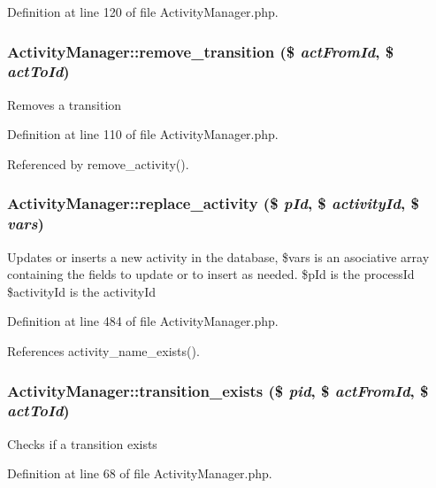 Definition at line 120 of file Activity\-Manager.php.
\subsubsection{\setlength{\rightskip}{0pt plus 5cm}Activity\-Manager::remove\_\-transition (\$ {\em act\-From\-Id}, \$ {\em act\-To\-Id})}\label{classActivityManager_a7}


Removes a transition 

Definition at line 110 of file Activity\-Manager.php.

Referenced by remove\_\-activity().
\subsubsection{\setlength{\rightskip}{0pt plus 5cm}Activity\-Manager::replace\_\-activity (\$ {\em p\-Id}, \$ {\em activity\-Id}, \$ {\em vars})}\label{classActivityManager_a19}


Updates or inserts a new activity in the database, \$vars is an asociative array containing the fields to update or to insert as needed. \$p\-Id is the process\-Id \$activity\-Id is the activity\-Id 

Definition at line 484 of file Activity\-Manager.php.

References activity\_\-name\_\-exists().
\subsubsection{\setlength{\rightskip}{0pt plus 5cm}Activity\-Manager::transition\_\-exists (\$ {\em pid}, \$ {\em act\-From\-Id}, \$ {\em act\-To\-Id})}\label{classActivityManager_a5}


Checks if a transition exists 

Definition at line 68 of file Activity\-Manager.php.
